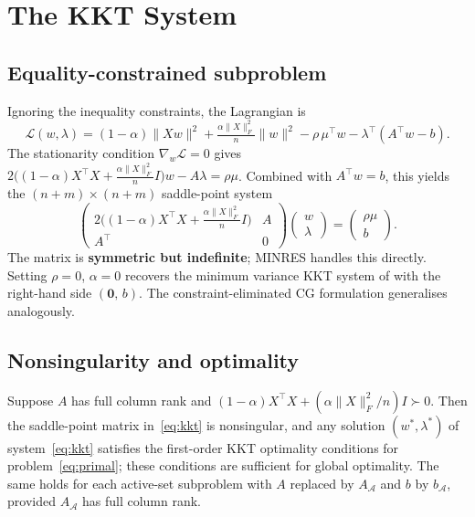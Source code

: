 \documentclass{siam/siamart}
\begin{document}
\section{The KKT System}\label{sec:kkt}

\subsection{Equality-constrained subproblem}


Ignoring the inequality constraints, the Lagrangian is
\[
\mathcal{L}(w, \lambda) = (1-\alpha)\|Xw\|^2 + \tfrac{\alpha\|X\|_F^2}{n}\|w\|^2 - \rho\,\mu^\top w - \lambda^\top(A^\top w - b).
\]
The stationarity condition $\nabla_w \mathcal{L} = 0$ gives
$2\bigl((1-\alpha)X^\top X + \tfrac{\alpha\|X\|_F^2}{n}I\bigr)w - A\lambda = \rho\mu$.
Combined with $A^\top w = b$, this yields the $(n+m)\times(n+m)$ saddle-point system
\begin{equation}\label{eq:kkt}
\begin{pmatrix} 2\bigl((1-\alpha)X^\top X + \tfrac{\alpha\|X\|_F^2}{n}I\bigr) & A \\ A^\top & 0 \end{pmatrix}
\begin{pmatrix} w \\ \lambda \end{pmatrix}
=
\begin{pmatrix} \rho\mu \\ b \end{pmatrix}.
\end{equation}
The matrix is \textbf{symmetric but indefinite}; MINRES \cite{paige1975} handles this directly.
Setting $\rho = 0$, $\alpha = 0$ recovers the minimum variance KKT system of \cite{minvar_paper} with the
right-hand side $(\mathbf{0},\, b)$. The constraint-eliminated CG formulation generalises analogously.

\subsection{Nonsingularity and optimality}

\begin{proposition}\label{prop:nonsingular}
Suppose $A$ has full column rank and $(1-\alpha)X^\top X + (\alpha\|X\|_F^2/n)I \succ 0$.  Then the
saddle-point matrix in~\eqref{eq:kkt} is nonsingular, and any solution
$(w^*, \lambda^*)$ of system~\eqref{eq:kkt} satisfies the first-order KKT
optimality conditions for problem~\eqref{eq:primal}; these conditions are
sufficient for global optimality.  The same holds for each active-set
subproblem with $A$ replaced by $A_{\mathcal{A}}$ and $b$ by $b_{\mathcal{A}}$,
provided $A_{\mathcal{A}}$ has full column rank.
\end{proposition}
\end{document}
